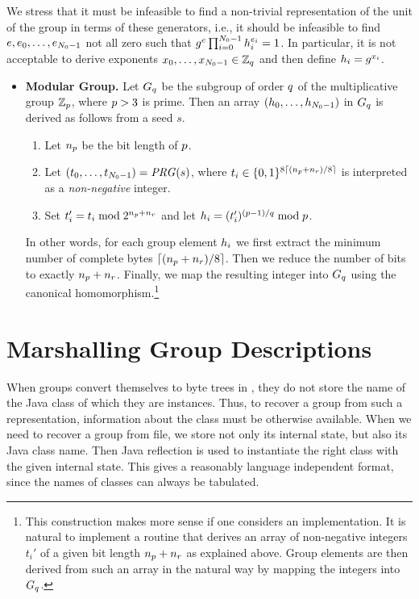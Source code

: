 \documentclass[11pt]{article}
\begin{document}
We stress that it must be infeasible to find a non-trivial
representation of the unit of the group in terms of these generators,
i.e., it should be infeasible to find $e,e_0,\ldots,e_{N_{0}-1}$ not
all zero such that $g^{e}\prod_{i=0}^{N_{0}-1}h_{i}^{e_i}=1$. In
particular, it is not acceptable to derive exponents
$x_0,\ldots,x_{N_{0}-1}\in\mathbb{Z}_{q}$ and then define $h_{i}=g^{x_i}$.

\begin{itemize}

\item\textbf{Modular Group.} Let $G_{q}$ be the subgroup of order $q$
  of the multiplicative group $\mathbb{Z}_{p}$, where $p>3$ is prime. Then
  an array $(h_{0},\ldots,h_{N_{0}-1})$ in $G_{q}$ is derived as
  follows from a seed $s$.
  \begin{enumerate}

  \item Let $n_{p}$ be the bit length of $p$.

  \item Let $(t_0,\ldots,t_{N_{0}-1})=\mathit{PRG}(s)$, where
    $t_i\in\{0,1\}^{8\lceil(n_{p}+n_r)/8\rceil}$ is
    interpreted as a \emph{non-negative} integer.

  \item Set $t_i'=t_i\bmod 2^{n_{p}+n_r}$ and let
    $h_{i}=(t_i')^{(p-1)/q}\bmod p$.

  \end{enumerate}
  In other words, for each group element $h_{i}$ we first extract the
  minimum number of complete bytes
  $\lceil(n_{p}+n_r)/8\rceil$.  Then we reduce the number of
  bits to exactly $n_{p}+n_r$. Finally, we map the resulting
  integer into $G_{q}$ using the canonical homomorphism.\footnote{This
    construction makes more sense if one considers an
    implementation. It is natural to implement a routine that derives
    an array of non-negative integers $t_i'$ of a given bit length
    $n_{p}+n_r$ as explained above. Group elements are then
    derived from such an array in the natural way by mapping the
    integers into $G_{q}$.}

\end{itemize}


\section{Marshalling Group Descriptions}
\label{sect:unmarshal}

When groups convert themselves to byte trees in \veri, they do not
store the name of the Java class of which they are instances. Thus, to
recover a group from such a representation, information about the
class must be otherwise available. When we need to recover a group
from file, we store not only its internal state, but also its Java
class name. Then Java reflection is used to instantiate the right
class with the given internal state. This gives a reasonably language
independent format, since the names of classes can always be
tabulated.
\end{document}
